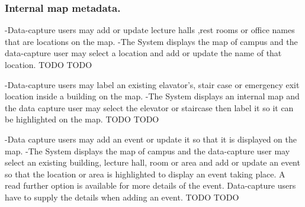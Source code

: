 \subsubsection {Internal map metadata.}
{-Data-capture users may add or update lecture halls ,rest rooms or office names that are locations on the map.
	-The System displays the map of campus and the data-capture user may select a location and add or update the name of that location.}
{TODO}
{TODO}

{-Data-capture users may label an existing elavator's, stair case or emergency exit location inside a building on the map.
-The System displays an internal map and the data capture user may select the elevator or staircase then label it so it can be highlighted on the map.}
{TODO}
{TODO}
 
{-Data capture users may add an event or update it so that it is displayed on the map.
        -The System displays the map of campus and the data-capture user may select an existing building, lecture hall, room or area and add or update an event so that the location or area is highlighted to display an event taking place. A read further option is available for more details of the event. Data-capture users have to supply the details when adding an event.}
{TODO}
{TODO}
 
         
           
         
